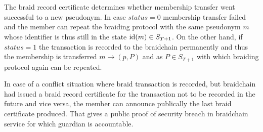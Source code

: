 \documentclass[12pt]{article}
\begin{document}
\\
\\
The braid record certificate determines whether membership transfer went successful to a new pseudonym. In case $status=0$ membership transfer failed and the member can repeat the braiding protocol with the same pseudonym $m$ whose identifier is thus still in the state ${\rm id}(m)\in S_{T+1}$. On the other hand, if $status=1$ the transaction is recorded to the braidchain permanently and thus the membership is transferred $m \to (p, P)$ and as $P \in S_{T+1}$ with which braiding protocol again can be repeated.

In case of a conflict situation where braid transaction is recorded, but braidchain had issued a braid record certificate for the transaction not to be recorded in the future and vice versa, the member can announce publically the last braid certificate produced. That gives a public proof of security breach in braidchain service for which guardian is accountable. 



\end{document}
